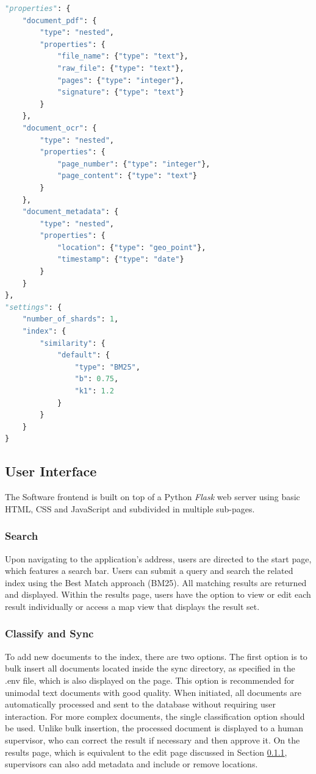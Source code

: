 \documentclass[12pt]{article}
\begin{document}
\begin{lstlisting}[language=Python, label=lst:es-ocr-index, caption={Elasticsearch ocr index}, float, floatplacement=H]
"properties": {
    "document_pdf": {
        "type": "nested",
        "properties": {
            "file_name": {"type": "text"},
            "raw_file": {"type": "text"},
            "pages": {"type": "integer"},
            "signature": {"type": "text"}
        }
    },
    "document_ocr": {
        "type": "nested",
        "properties": {
            "page_number": {"type": "integer"},
            "page_content": {"type": "text"}
        }
    },
    "document_metadata": {
        "type": "nested",
        "properties": {
            "location": {"type": "geo_point"},
            "timestamp": {"type": "date"}
        }
    }
},
"settings": {
    "number_of_shards": 1,
    "index": {
        "similarity": {
            "default": {
                "type": "BM25",
                "b": 0.75,
                "k1": 1.2
            }
        }
    }
}
\end{lstlisting}

\subsection{User Interface}
\label{ssec:ui}

The Software frontend is built on top of a Python \textit{Flask} web server using basic HTML, CSS and JavaScript and subdivided in multiple sub-pages. 

\subsubsection{Search}
\label{sssec:search}

Upon navigating to the application's address, users are directed to the start page, which features a search bar. Users can submit a query and search the related index using the Best Match approach (BM25). All matching results are returned and displayed. Within the results page, users have the option to view or edit each result individually or access a map view that displays the result set.

\subsubsection{Classify and Sync}
\label{sssec:classify-sync}

To add new documents to the index, there are two options. The first option is to bulk insert all documents located inside the sync directory, as specified in the .env file, which is also displayed on the page. This option is recommended for unimodal text documents with good quality. When initiated, all documents are automatically processed and sent to the database without requiring user interaction. For more complex documents, the single classification option should be used. Unlike bulk insertion, the processed document is displayed to a human supervisor, who can correct the result if necessary and then approve it. On the results page, which is equivalent to the edit page discussed in Section \ref{sssec:search}, supervisors can also add metadata and include or remove locations.
\end{document}
